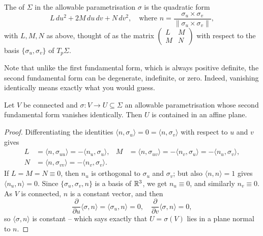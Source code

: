 \documentclass[a4paper]{scrartcl}
\begin{document}
\begin{definition}
    The  of $\Sigma$ in the allowable parametrisation $\sigma$ is the quadratic form
    $$
    L \, du^2 + 2M \, du \, dv + N \, dv^2, \quad \text{where } n = \frac{\sigma_u \times \sigma_v}{\|\sigma_u \times \sigma_v\|},
    $$
    with $L, M, N$ as above, thought of as the matrix $\begin{pmatrix} L & M \\ M & N \end{pmatrix}$ with respect to the basis $\{\sigma_u, \sigma_v\}$ of $T_p \Sigma$.
\end{definition}

Note that unlike the first fundamental form, which is always positive definite, the second fundamental form can be degenerate, indefinite, or zero. Indeed, vanishing identically means exactly what you would guess.

\begin{lemma}
    Let $V$ be connected and $\sigma : V \rightarrow U \subseteq \Sigma$ an allowable parametrisation whose second fundamental form vanishes identically. Then $U$ is contained in an affine plane.
\end{lemma}
\begin{proof}
    Differentiating the identities $\langle n, \sigma_u \rangle = 0 = \langle n, \sigma_v \rangle$ with respect to $u$ and $v$ gives
    \begin{align*}
        L &= \langle n, \sigma_{uu} \rangle = -\langle n_u, \sigma_u \rangle, &
        M &= \langle n, \sigma_{uv} \rangle = -\langle n_v, \sigma_u\rangle = -\langle n_u, \sigma_v \rangle, \\
        N &= \langle n, \sigma_{vv} \rangle = -\langle n_v, \sigma_v \rangle. & &
    \end{align*}
    If $L = M = N \equiv 0$, then $n_u$ is orthogonal to $\sigma_u$ and $\sigma_v$; but also $\langle n, n \rangle = 1$ gives $\langle n_u, n \rangle = 0$. Since $\{\sigma_u, \sigma_v, n\}$ is a basis of $\mathbb{R}^3$, we get $n_u \equiv 0$, and similarly $n_v \equiv 0$. As $V$ is connected, $n$ is a constant vector, and then
    $$
    \frac{\partial}{\partial u}\langle \sigma, n \rangle = \langle \sigma_u, n \rangle = 0, \quad \frac{\partial}{\partial v}\langle \sigma, n \rangle = 0,
    $$
    so $\langle \sigma, n \rangle$ is constant -- which says exactly that $U = \sigma(V)$ lies in a plane normal to $n$.
\end{proof}
\end{document}
